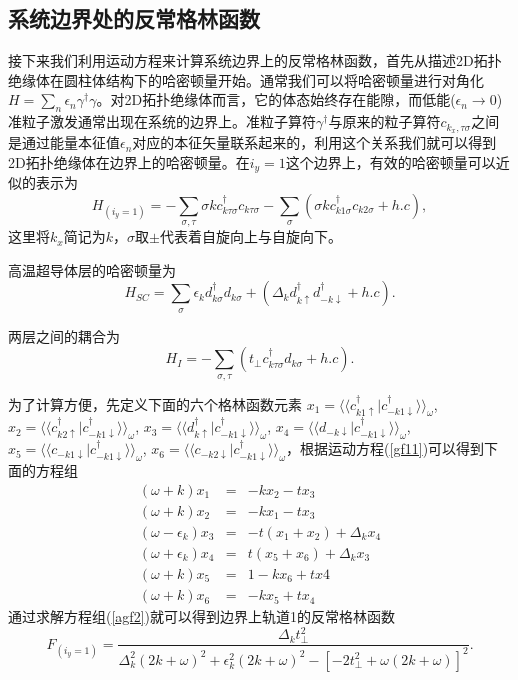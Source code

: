 \subsection{系统边界处的反常格林函数}
接下来我们利用运动方程来计算系统边界上的反常格林函数，首先从描述2D拓扑绝缘体在圆柱体结构下的哈密顿量开始。通常我们可以将哈密顿量进行对角化$H=\sum_n\epsilon_n\gamma^\dagger\gamma$。对2D拓扑绝缘体而言，它的体态始终存在能隙，而低能($\epsilon_n\rightarrow 0$)准粒子激发通常出现在系统的边界上。准粒子算符$\gamma^\dagger$与原来的粒子算符$c_{k_x,\tau\sigma}$之间是通过能量本征值$\epsilon_n$对应的本征矢量联系起来的，利用这个关系我们就可以得到2D拓扑绝缘体在边界上的哈密顿量。在$i_y=1$这个边界上，有效的哈密顿量可以近似的表示为
\begin{equation}
H_{(i_y=1)}=-\sum_{\sigma,\tau}\sigma k c_{k\tau\sigma}^\dagger c_{k\tau\sigma}-\sum_\sigma(\sigma k c_{k1\sigma}^\dagger c_{k2\sigma}+h.c),\label{iy1}
\end{equation}
这里将$k_x$简记为$k$，$\sigma$取$\pm$代表着自旋向上与自旋向下。

高温超导体层的哈密顿量为
\begin{equation}
H_{SC}=\sum_\sigma\epsilon_{k} d_{k\sigma}^\dagger d_{k\sigma}+(\Delta_{ k} d_{k\uparrow}^\dagger d_{-k\downarrow}^\dagger+h.c).
\end{equation}

两层之间的耦合为
\begin{equation}
H_I=-\sum_{\sigma,\tau}(t_\perp c_{k\tau\sigma}^\dagger d_{k\sigma}+h.c).
\end{equation}

为了计算方便，先定义下面的六个格林函数元素
$x_1=\langle\langle c_{k1\uparrow}^\dagger|c_{-k1\downarrow}^\dagger$$\rangle$$\rangle_\omega$, $x_2=\langle\langle c_{k2\uparrow}^\dagger|c_{-k1\downarrow}^\dagger$$\rangle$$\rangle_\omega$, $x_3=\langle\langle d_{k\uparrow}^\dagger|c_{-k1\downarrow}^\dagger\rangle\rangle_\omega$, $x_4=\langle\langle d_{-k\downarrow}|c_{-k1\downarrow}^\dagger\rangle\rangle_\omega$, $x_5=\langle\langle c_{-k1\downarrow}|c_{-k1\downarrow}^\dagger\rangle\rangle_\omega$, $x_6=\langle\langle c_{-k2\downarrow}|c_{-k1\downarrow}^\dagger\rangle\rangle_\omega$，根据运动方程(\ref{gf11})可以得到下面的方程组
\begin{subequations}
	\begin{eqnarray}
	(\omega+k)x_1&=&-kx_2-tx_3\\
	(\omega+k)x_2&=&-kx_1-tx_3\\
	(\omega-\epsilon_{k})x_3&=&-t(x_1+x_2)+\Delta_{k} x_4\\
	(\omega+\epsilon_{k})x_4&=&t(x_5+x_6)+\Delta_{k} x_3\\
	(\omega+k)x_5&=&1-k x_6+tx4\\
	(\omega+k)x_6&=&-k x_5+tx_4
	\end{eqnarray}\label{agf2}
\end{subequations}
通过求解方程组(\ref{agf2})就可以得到边界上轨道1的反常格林函数
\begin{equation}
F_{(i_y=1)}=\frac{\Delta_{k} t_\perp^2}{\Delta_k^2(2k+\omega)^2+\epsilon_k^2(2k+\omega)^2-[-2t_\perp^2+\omega(2k+\omega)]^2}.
\end{equation}

